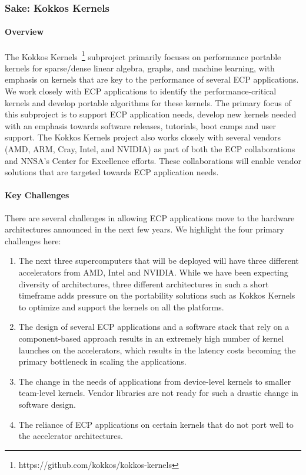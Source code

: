 \subsubsection{ Sake: Kokkos Kernels} 
\paragraph{Overview} 
The Kokkos Kernels~\footnote{https://github.com/kokkos/kokkos-kernels} subproject primarily focuses on performance portable kernels
for sparse/dense linear algebra, graphs, and machine learning, with emphasis on
kernels that are key to the performance of
several ECP applications. We work closely with ECP applications to identify the
performance-critical kernels and develop portable algorithms for these kernels.
The primary focus of this subproject is to support ECP application needs, develop new
kernels needed with an emphasis towards software releases, tutorials, boot camps
and user support. The Kokkos Kernels project also works closely with several vendors
(AMD, ARM, Cray, Intel, and NVIDIA) as part of both the ECP collaborations and
NNSA's Center for Excellence efforts. These collaborations will  enable vendor solutions
that are targeted towards ECP application needs.

\paragraph{Key  Challenges}
There are several challenges in allowing ECP applications move to the hardware architectures
announced in the next few years. We highlight the four primary challenges here:
\begin{enumerate}
\item 
The next three supercomputers that will be deployed will have
three different accelerators from AMD, Intel and NVIDIA. While we have been expecting diversity of architectures, three
different architectures in such a short timeframe adds pressure on the portability
solutions such as Kokkos Kernels to optimize and support the kernels on all the platforms.
\item
The design of several ECP applications and a software stack that rely on a component-based
approach results in an extremely high number of kernel launches on the accelerators, which
results in the latency costs becoming the primary bottleneck in scaling the applications.
\item
The change in the needs of applications from device-level kernels to smaller team-level kernels. Vendor
libraries are not ready for such a drastic change in software design.
\item 
The reliance of ECP applications on certain kernels that do not port well to the  accelerator architectures.
\end{enumerate}


